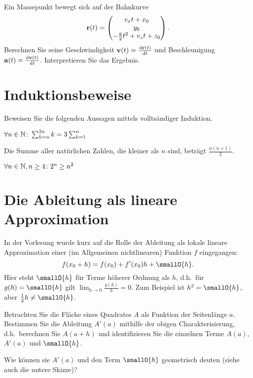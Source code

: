 \documentclass{scrartcl}
\begin{document}
Ein Massepunkt bewegt sich auf der Bahnkurve
\[
  \mathbf{r}(t) = \begin{pmatrix}v_x t + x_0 \\ y_0 \\ -\frac{g}{2} t^2 + v_z t + z_0\end{pmatrix}.
\]
Berechnen Sie seine Geschwindigkeit $\mathbf{v}(t) = \frac{\mathrm{d} \mathbf{r}(t)}{\mathrm{d} t}$ und Beschleunigung $\mathbf{a}(t) = \frac{\mathrm{d} \mathbf{v}(t)}{\mathrm{d} t}$.
Interpretieren Sie das Ergebnis.


\section{Induktionsbeweise}
Beweisen Sie die folgenden Aussagen mittels volltsändiger Induktion.
\begin{subex}
  \item $\forall n \in \mathbb{N}\colon \sum_{k = n}^{2n} k = 3 \sum_{k=1}^n$
  \item Die Summe aller natürlichen Zahlen, die kleiner als $n$ sind, beträgt $\frac{n(n+1)}{2}$.
  \item $\forall n \in \mathbb{N}, n \ge 4\colon 2^n \ge n^2$
\end{subex}

\section{Die Ableitung als lineare Approximation }
\label{sec:ableitung_als_lineare_approximation}

In der Vorlesung wurde kurz auf die Rolle der Ableitung als lokale lineare Approximation einer (im Allgemeinen nichtlinearen) Funktion $f$ eingegangen:
\[
  f(x_0 + h) = f(x_0) + f'(x_0) h + \smallO{h}.
\]
Hier steht $\smallO{h}$ für Terme höherer Ordnung als $h$, d.h.\ für $g(h) = \smallO{h}$ gilt $\lim_{h \to 0} \frac{g(h)}{h} = 0$.
Zum Beispiel ist $h^2 = \smallO{h}$, aber $\frac{1}{2}h \neq \smallO{h}$.

Betrachten Sie die Fläche eines Quadrates $A$ als Funktion der Seitenlänge $a$.
Bestimmen Sie die Ableitung $A'(a)$ mithilfe der obigen Charakterisierung, d.h.\ berechnen Sie $A(a + h)$ und identifizieren Sie die einzelnen Terme $A(a)$, $A'(a)$ und $\smallO{h}$.

Wie können sie $A'(a)$ und den Term $\smallO{h}$ geometrisch deuten (siehe auch die untere Skizze)?



\begin{center}
\end{center}
\end{document}
